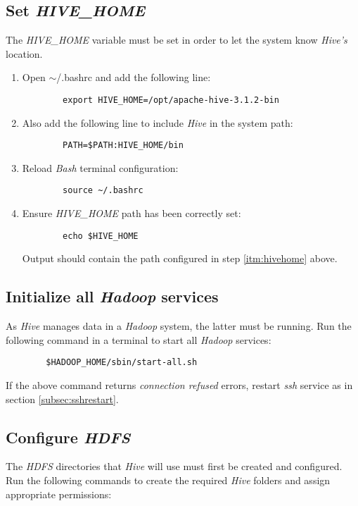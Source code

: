\documentclass{article}
\begin{document}
    \subsection{Set \emph{HIVE\_HOME}}
    The \emph{HIVE\_HOME} variable must be set in order to let the system know \emph{Hive's} location.
    \begin{enumerate}
        \item Open $\sim$/.bashrc and add the following line:
        \label{itm:hivehome}
        \begin{verbatim}
        export HIVE_HOME=/opt/apache-hive-3.1.2-bin
        \end{verbatim}

        \item Also add the following line to include \emph{Hive} in the system path:
        \begin{verbatim}
        PATH=$PATH:HIVE_HOME/bin
        \end{verbatim}

        \item Reload \emph{Bash} terminal configuration:
        \begin{verbatim}
        source ~/.bashrc
        \end{verbatim}
        
        \item Ensure \emph{HIVE\_HOME} path has been correctly set:
        \begin{verbatim}
        echo $HIVE_HOME
        \end{verbatim}
        Output should contain the path configured in step \ref{itm:hivehome} above.

    \end{enumerate}

    \subsection{Initialize all \emph{Hadoop} services}
    \label{subsec:hadoopall}
    As \emph{Hive} manages data in a \emph{Hadoop} system, the latter must be running.
    Run the following command in a terminal to start all \emph{Hadoop} services:
    \begin{verbatim}
        $HADOOP_HOME/sbin/start-all.sh
    \end{verbatim}
    If the above command returns \emph{connection refused} errors, restart \emph{ssh} service as
    in section \ref{subsec:sshrestart}.

    \subsection{Configure \emph{HDFS}}
    The \emph{HDFS} directories that \emph{Hive} will use must first be created and configured.
    Run the following commands to create the required \emph{Hive} folders and assign appropriate
    permissions:
\end{document}
